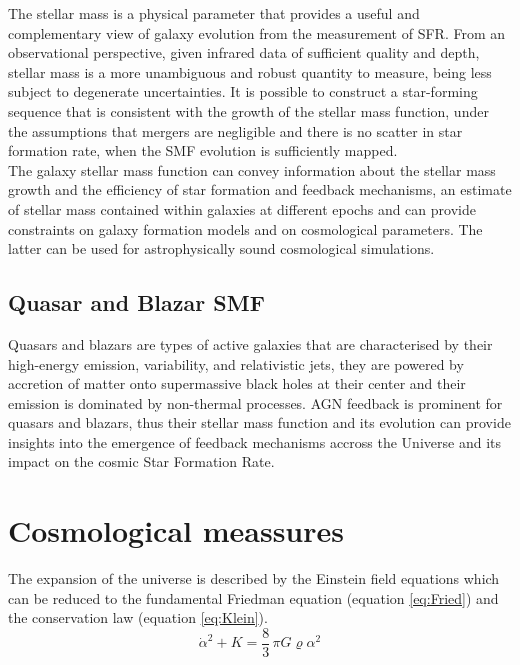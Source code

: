 The stellar mass is a physical parameter that provides a useful and complementary view of galaxy evolution from the measurement of SFR. From an observational perspective, given infrared data of sufficient quality and depth, stellar mass is a more unambiguous and robust quantity to measure\cite{Grazian2015A}, being less subject to degenerate uncertainties. It is possible to construct\cite{Leja2015} a star-forming sequence that is consistent with the growth of the stellar mass function, under the assumptions that mergers are negligible and there is no scatter in star formation rate, when the SMF evolution is sufficiently mapped.\\
The galaxy stellar mass function can convey information about the stellar mass growth and the efficiency of star formation and feedback mechanisms, an estimate of stellar mass contained within galaxies at different epochs and can provide constraints on galaxy formation models and on cosmological parameters. The latter can be used for astrophysically sound cosmological simulations.

\subsection*{Quasar and Blazar SMF}
Quasars and blazars are types of active galaxies that are characterised by their high-energy emission, variability, and relativistic jets, they are powered by accretion of matter onto supermassive black holes at their center and their emission is dominated by non-thermal processes. AGN feedback is prominent for quasars and blazars, thus their stellar mass function and its evolution can provide insights into the emergence of feedback mechanisms accross the Universe and its impact on the cosmic Star Formation Rate.

\section{Cosmological meassures} \label{sec:Cosmo}
The expansion of the universe is described by the Einstein field equations which can be reduced to the fundamental Friedman equation (equation \ref{eq:Fried}) and the conservation law (equation \ref{eq:Klein}).
\begin{equation} 
\dot{\alpha}^2 +K = \dfrac{8}{3}\, \pi G \varrho \alpha^2  
\label{eq:Fried} 
\end{equation} 

